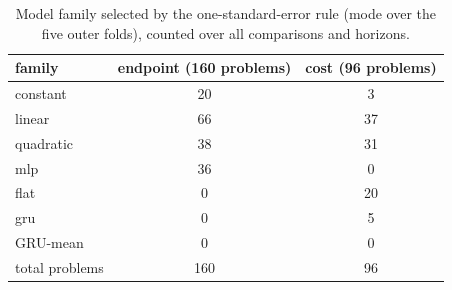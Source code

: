 \begin{table}[htbp]
\centering
\small
\caption{Model family selected by the one-standard-error rule (mode over the five outer folds), counted over all comparisons and horizons.}\label{tab:selection}
\begin{tabular}{l cc}
\toprule
family & endpoint (160 problems) & cost (96 problems) \\
\midrule
constant & 20 & 3 \\
linear & 66 & 37 \\
quadratic & 38 & 31 \\
mlp & 36 & 0 \\
flat & 0 & 20 \\
gru & 0 & 5 \\
GRU-mean & 0 & 0 \\
total problems & 160 & 96 \\
\bottomrule
\end{tabular}
\end{table}